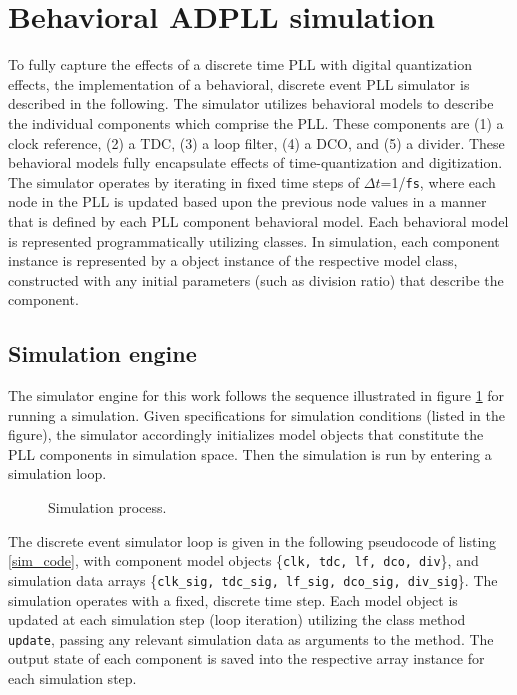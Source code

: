 \pagebreak
\section{Behavioral ADPLL simulation}
To fully capture the effects of a discrete time PLL with digital quantization effects, the implementation of a behavioral, discrete event PLL simulator is described in the following. The simulator utilizes behavioral models to describe the individual components which comprise the PLL. These components are (1) a clock reference, (2) a TDC, (3) a loop filter, (4) a DCO, and (5) a divider. These behavioral models fully encapsulate effects of time-quantization and digitization. The simulator operates by iterating in fixed time steps of $\Delta t$=1/\texttt{fs}, where each node in the PLL is updated based upon the previous node values in a manner that is defined by each PLL component behavioral model. Each behavioral model is represented programmatically utilizing classes. In simulation, each component instance is represented by a object instance of the respective model class, constructed with any initial parameters (such as division ratio) that describe the component.
\subsection{Simulation engine}
The simulator engine for this work follows the sequence illustrated in figure \ref{fig:simulator} for running a simulation. Given specifications for simulation conditions (listed in the figure), the simulator accordingly initializes model objects that constitute the PLL components in simulation space. Then the simulation is run by entering a simulation loop. 
\begin{figure}[htb!]
	\center
	\caption{Simulation process.}
	\label{fig:simulator}
\end{figure}
\FloatBarrier
The discrete event simulator loop is given in the following pseudocode of listing \ref{sim_code}, with component model objects \{\texttt{clk, tdc, lf, dco, div}\}, and simulation data arrays \{\texttt{clk\_sig, tdc\_sig, lf\_sig, dco\_sig, div\_sig}\}. The simulation operates with a fixed, discrete time step. Each model object is updated at each simulation step (loop iteration) utilizing the class method \texttt{update}, passing any relevant simulation data as arguments to the method. The output state of each component is saved into the respective array instance for each simulation step. 

